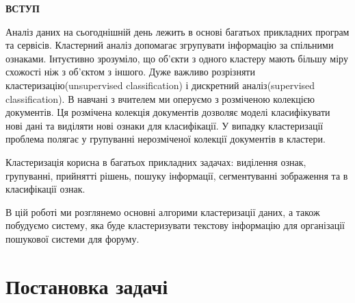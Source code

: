 \documentclass[a4paper,14pt,russian]{extreport}
\newcommand{\empline}{\mbox{}\newline}
\newcommand{\likechapterheading}[1]{
\begin{center}
     \textbf{\MakeUppercase{#1}}
     \end{center}
         \empline}
\newcommand{\likechapter}[1]{
\likechapterheading{#1}
\addcontentsline{toc}{likechapter}{\MakeUppercase{#1}}}
\begin{document}
 

\newpage
\tableofcontents
\newpage

\likechapter{Вступ}
Аналіз даних на сьогоднішній день лежить в основі багатьох прикладних програм та сервісів. Кластерний аналіз допомагає згрупувати інформацію за спільними ознаками. Інтуєтивно зрозуміло, що об'єкти з одного кластеру мають більшу міру схожості ніж з об'єктом з іншого. Дуже важливо розрізняти кластеризацію(unsupervised classification) і дискретний аналіз(supervised classification). В навчані з вчителем ми оперуємо з розміченою колекцією документів. Ця розмічена колекція документів дозволяє моделі класифікувати нові дані та виділяти нові ознаки для класифікації. У випадку кластеризації проблема полягає у групуванні нерозміченої колекції документів в  кластери. \par 
Кластеризація корисна в багатьох прикладних задачах: виділення ознак, групуванні, прийнятті рішень, пошуку інформації, сегментуванні зображення та в класифікації ознак. \par 
В цій роботі ми розглянемо основні алгорими кластеризації даних, а також побудуємо систему, яка буде 
кластеризувати текстову інформацію для організації пошукової системи для форуму.

\chapter{Постановка задачі}
\end{document}
